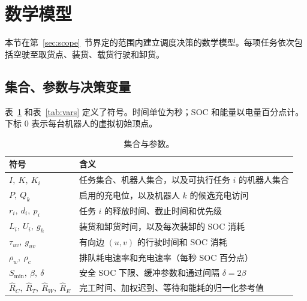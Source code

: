 \documentclass[11pt,a4paper,fontset=none]{ctexart}
\begin{document}
\section{数学模型}
\label{sec:model}

本节在第~\ref{sec:scope}~节界定的范围内建立调度决策的数学模型。每项任务依次包括空驶至取货点、装货、载货行驶和卸货。

\subsection{集合、参数与决策变量}

表~\ref{tab:sets} 和表~\ref{tab:vars} 定义了符号。时间单位为秒；SOC 和能量以电量百分点计。下标 0
表示每台机器人的虚拟初始顶点。

\begin{table}[!htbp]
\centering\small
\caption{集合与参数。}
\label{tab:sets}
\begin{tabularx}{0.92\linewidth}{lX}
\toprule
符号 & 含义 \\
\midrule
$I,\ K,\ K_i$ & 任务集合、机器人集合，以及可执行任务 $i$ 的机器人集合 \\
$P,\ Q_k$ & 启用的充电位，以及机器人 $k$ 的候选充电访问 \\
$r_i,\ d_i,\ p_i$ & 任务 $i$ 的释放时间、截止时间和优先级 \\
$L_i,\ U_i,\ g_h$ & 装货和卸货时间，以及每次装卸的 SOC 消耗 \\
$\tau_{uv},\ g_{uv}$ & 有向边 $(u,v)$ 的行驶时间和 SOC 消耗 \\
$\rho_w,\ \rho_c$ & 排队耗电速率和充电速率（每秒 SOC 百分点） \\
$S_{\min},\ \beta,\ \delta$ & 安全 SOC 下限、缓冲参数和通过间隔 $\delta = 2\beta$ \\
$\hat R_C,\ \hat R_T,\ \hat R_W,\ \hat R_E$ & 完工时间、加权迟到、等待和能耗的归一化参考值 \\
\bottomrule
\end{tabularx}
\end{table}
\end{document}
